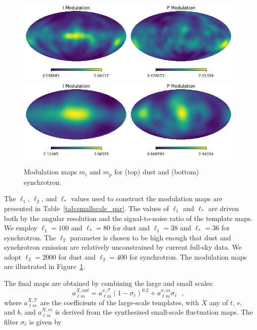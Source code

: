 \documentclass[twocolumn]{aastex631}
\begin{document}
 \begin{figure}
     \centering
     \includegraphics[width=2\columnwidth]{figures/mod_dust.png}\\
      \includegraphics[width=2\columnwidth]{figures/mod_synch.png}\\
     \caption{Modulation maps $m_i$ and $m_p$ for (top) dust and  (bottom) synchrotron. }
     \label{fig:modulation_maps}
 \end{figure}
 
The $\ell_1$, $\ell_2$, and $\ell_*$ values used to construct the modulation maps are presented in Table~\ref{tab:smallscale_par}. The values of $\ell_1$ and $\ell_*$ are driven both by the angular resolution and the signal-to-noise ratio of the template maps. We employ $\ell_1=100$ and $\ell_*=80$ for dust and $\ell_1=38$ and $\ell_*=36$ for synchrotron. The $\ell_2$ parameter is chosen to be high enough that dust and synchrotron emission are relatively unconstrained by current full-sky data. We adopt  $\ell_2=2000$ for dust and $\ell_2 = 400$ for synchrotron. The modulation maps are illustrated in Figure~\ref{fig:modulation_maps}.

The final maps are obtained by combining the large and small scales: 
\begin{equation} \label{eq:filter}
    a_{\ell m }^{X, out}=  a_{\ell m }^{x, \mathcal{T}} \left(1-\sigma_\ell\right)^{0.2} + a_{\ell m }^{x, ss} \sigma_\ell
    ~~~, 
\end{equation}
where $a_{\ell m }^{X, \mathcal{T}}$ are the coefficients of the large-scale templates, with $X$ any of $t$, $e$, and $b$, and $a_{\ell m }^{X, ss}$ is derived from the synthesized small-scale fluctuation maps. The filter $\sigma_\ell$ is given by
\end{document}
